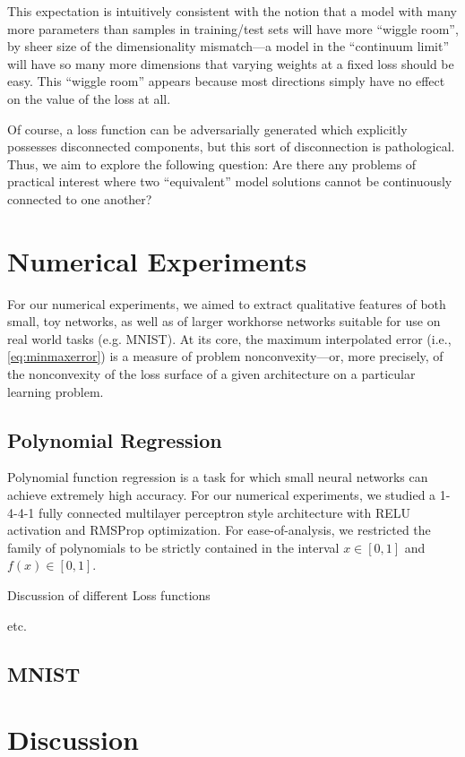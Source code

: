 \documentclass[twocolumn,superscriptaddress,aps,prb,floatfix]{revtex4-1}
\begin{document}
This expectation is intuitively consistent with the notion that a model with many more parameters than samples in training/test sets will have more ``wiggle room'', by sheer size of the dimensionality mismatch---a model in the ``continuum limit'' will have so many more dimensions that varying weights at a fixed loss should be easy.  This ``wiggle room'' appears because most directions simply have no effect on the value of the loss at all.

Of course, a loss function can be adversarially generated which explicitly possesses disconnected components, but this sort of disconnection is pathological.  Thus, we aim to explore the following question: Are there any problems of practical interest where two ``equivalent'' model solutions cannot be continuously connected to one another?


 
 
\section{Numerical Experiments}
\label{sec:NumExp}

For our numerical experiments, we aimed to extract qualitative features of both small, toy networks, as well as of larger workhorse networks suitable for use on real world tasks (e.g. MNIST).  At its core, the maximum interpolated error (i.e., \eqref{eq:minmaxerror}) is a measure of problem nonconvexity---or, more precisely, of the nonconvexity of the loss surface of a given architecture on a particular learning problem.


\subsection{Polynomial Regression}
\label{sec:PolyFuncs}

 Polynomial function regression is a task for which small neural networks can achieve extremely high accuracy.  For our numerical experiments, we studied a 1-4-4-1 fully connected multilayer perceptron style architecture with RELU activation and RMSProp optimization.  For ease-of-analysis, we restricted the family of polynomials to be strictly contained in the interval $x\in[0,1]$ and $f(x)\in[0,1]$.
 
 Discussion of different Loss functions
 
 etc.


\subsection{MNIST}
\label{sec:MNIST}


\section{Discussion}
\label{sec:Discussion}

 
 


\end{document}
